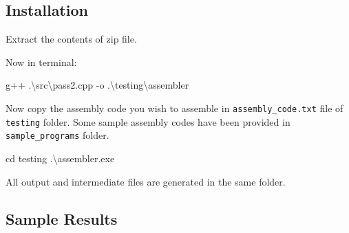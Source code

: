 \documentclass[
]{article}
\newenvironment{Shaded}{}{}
\newcommand{\NormalTok}[1]{#1}
\begin{document}
\vspace{0.5cm}
\subsection{Installation}\label{installation}

Extract the contents of zip file.

Now in terminal:

\begin{Shaded}
\begin{Highlighting}[]
\NormalTok{g++ .\textbackslash{}src\textbackslash{}pass2.cpp {-}o .\textbackslash{}testing\textbackslash{}assembler}
\end{Highlighting}
\end{Shaded}

Now copy the assembly code you wish to assemble in
\texttt{assembly\_code.txt} file of \texttt{testing} folder. Some sample
assembly codes have been provided in \texttt{sample\_programs} folder.

\begin{Shaded}
\begin{Highlighting}[]
\NormalTok{cd testing}
\NormalTok{.\textbackslash{}assembler.exe}
\end{Highlighting}
\end{Shaded}

All output and intermediate files are generated in the same folder.

\vspace{0.5cm}
\subsection{Sample Results}\label{sample-results}
\end{document}
